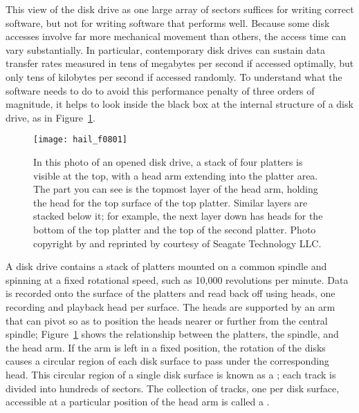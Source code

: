 This view of the disk drive as one large array of sectors suffices for
writing correct software, but not for writing software that performs
well.  Because some disk accesses involve far more mechanical movement
than others, the access time can vary substantially.  In particular,
contemporary disk drives can sustain data transfer rates measured in
tens of megabytes per second if accessed optimally, but only tens of
kilobytes per second if accessed randomly.  To understand what the
software needs to do to avoid this performance penalty of three orders
of magnitude, it helps to look inside the black box at the internal
structure of a disk drive, as in Figure~\ref{photo-8-1}.
\begin{figure}
\centerline{\texttt{[image: hail\_f0801]}}
\caption{In this photo of an opened disk drive, a stack of four
platters is visible at the top, with a head arm
extending into the platter
area.  The part you can see is the topmost layer of the head arm,
holding the head for the top surface of the top platter.  Similar
layers are stacked below it; for example, the next layer down has
heads for the bottom of the top platter and the top of the second
platter.
Photo copyright by and reprinted by courtesy of Seagate Technology LLC.}
\label{photo-8-1}
\end{figure}

A disk drive contains a stack of platters mounted on a common spindle
and spinning at a fixed rotational speed, such as 10,000 revolutions
per minute.  Data is recorded onto the surface of the platters and
read back off using heads, one recording and playback head per
surface.  The heads are supported by an arm that can pivot so as to
position the heads nearer or further from the central spindle;
Figure~\ref{photo-8-1} shows the relationship between the platters,
the spindle, and the head arm.
If the
arm is left in a fixed position, the rotation of the disks causes a
circular region of each disk surface to pass under the corresponding
head.  This circular region of a single disk surface is known as a
; each track is divided into hundreds of sectors.  The
collection of tracks, one per disk surface, accessible at a particular
position of the head arm is called a .

